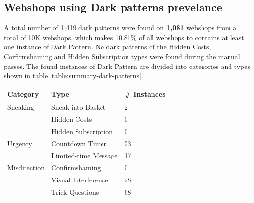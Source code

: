     \subsection{Webshops using Dark patterns prevelance}
    
    A total number of 1,419 dark patterns were found on \textbf{1,081} webshops from a total of 10K webshops, which makes 10.81\% of all webshops to contains at least one instance of Dark Pattern. No dark patterns of the Hidden Costs, Corfirmshaming and Hidden Subscription types were found during the manual passes. The found instances of Dark Pattern are divided into categories and types shown in table \ref{table:summary-dark-patterns}.
    
    
    \begin{table}[h!]
        \centering
        \bgroup
        \def\arraystretch{1.65}
            \begin{tabular}{ll|l}
                \toprule
                \textbf{Category}                     & \textbf{Type}                      & \textbf{\# Instances}                     \\ \hline
                Sneaking                              & Sneak into Basket                  & 2                                         \\
                                                        & Hidden Costs                       & 0                                         \\
                                                        & Hidden Subscription                & 0                                         \\ \hline
                Urgency                               & Countdown Timer                    & 23                                        \\
                                                        & Limited-time Message               & 17                                        \\ \hline
                Misdirection                          & Confirmshaming                     & 0                                         \\
                                                        & Visual Interference                & 28                                        \\
                                                        & Trick Questions                    & 68                                        \\

\end{tabular}
\end{table}
